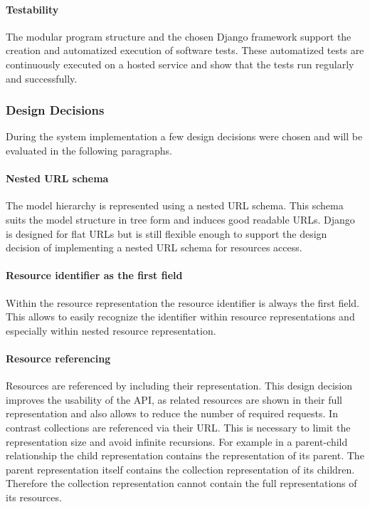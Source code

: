 \paragraph{Testability}

The modular program structure and the chosen Django framework support the creation and automatized execution of software tests.
These automatized tests are continuously executed on a hosted service and show that the tests run regularly and successfully.


\subsubsection{Design Decisions}

During the system implementation a few design decisions were chosen and will be evaluated in the following paragraphs.

\paragraph{Nested URL schema}

The model hierarchy is represented using a nested URL schema.
This schema suits the model structure in tree form and induces good readable URLs.
Django is designed for flat URLs but is still flexible enough to support the design decision of implementing a nested URL schema for resources access.

\paragraph{Resource identifier as the first field}

Within the resource representation the resource identifier is always the first field.
This allows to easily recognize the identifier within resource representations and especially within nested resource representation.

\paragraph{Resource referencing}

Resources are referenced by including their representation.
This design decision improves the usability of the API, as related resources are shown in their full representation and also allows to reduce the number of required requests.
In contrast collections are referenced via their URL.
This is necessary to limit the representation size and avoid infinite recursions.
For example in a parent-child relationship the child representation contains the representation of its parent.
The parent representation itself contains the collection representation of its children.
Therefore the collection representation cannot contain the full representations of its resources.

